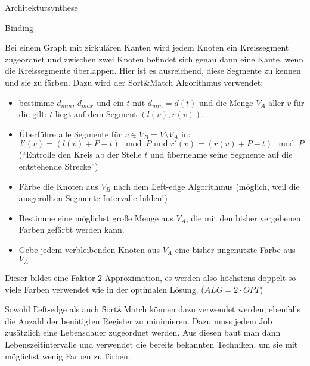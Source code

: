 \begin{chapter}{Architektursynthese}
\begin{section}{Binding}
 
 Bei einem \f{Graph mit zirkulären Kanten} wird jedem Knoten ein Kreissegment zugeordnet und zwischen zwei Knoten befindet sich genau dann eine Kante, wenn die Kreissegmente überlappen. Hier ist es ausreichend, diese Segmente zu kennen und sie zu färben. Dazu wird der \f{Sort\&Match Algorithmus} verwendet:
 
 \begin{itemize}
  \item bestimme $d_{min}$, $d_{max}$ und ein $t$ mit $d_{min} = d(t)$ und die Menge $V_A$ aller $v$ für die gilt: $t$ liegt auf dem Segment $(l(v),r(v))$.
  \item Überführe alle Segmente für $v\in V_B = V\setminus V_A$ in:
  \[ l'(v) = (l(v) + P - t)\mod P \text{ und } r'(v) = (r(v)+P-t)\mod P \] 
  (``Entrolle den Kreis ab der Stelle $t$ und übernehme seine Segmente auf die entstehende Strecke'')
  \item Färbe die Knoten aus $V_B$ nach dem \f{Left-edge Algorithmus} (möglich, weil die ausgerollten Segmente Intervalle bilden!)
  \item Bestimme eine möglichst große Menge aus $V_A$, die mit den bisher vergebenen Farben gefärbt werden kann.
  \item Gebe jedem verbleibenden Knoten aus $V_A$ eine bisher ungenutzte Farbe aus $V_A$
 \end{itemize}
Dieser bildet eine Faktor-2-Approximation, es werden also höchstens doppelt so viele Farben verwendet wie in der optimalen Lösung. ($ALG = 2\cdot OPT$)
 
 Sowohl \f{Left-edge} als auch \f{Sort\&Match} können dazu verwendet werden, ebenfalls die Anzahl der benötigten Register zu minimieren. Dazu muss jedem Job zusätzlich eine Lebensdauer zugeordnet werden. Aus diesen baut man dann Lebenszeitintervalle und verwendet die bereits bekannten Techniken, um sie mit möglichst wenig Farben zu färben.

\end{section}

 
\end{chapter}
